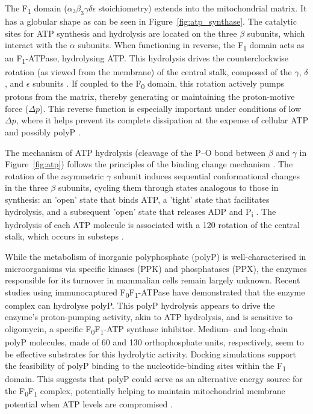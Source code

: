 The F\textsubscript{1} domain ($\alpha_3\beta_3\gamma\delta\epsilon$ stoichiometry) extends into the mitochondrial matrix. It has a globular shape as can be seen in Figure~\ref{fig:atp_synthase}. The catalytic sites for ATP synthesis and hydrolysis are located on the three $\beta$ subunits, which interact with the $\alpha$ subunits. When functioning in reverse, the F\textsubscript{1} domain acts as an F\textsubscript{1}-ATPase, hydrolysing ATP. This hydrolysis drives the counterclockwise rotation (as viewed from the membrane) of the central stalk, composed of the $\gamma$, $\delta$, and $\epsilon$ subunits \citep{walkerATPSynthesisRotary1998, walkerATPSynthaseUnderstood2013, boyerEnergyLifeATP1998}. If coupled to the F\textsubscript{0} domain, this rotation actively pumps protons from the matrix, thereby generating or maintaining the proton-motive force ($\Delta p$). This reverse function is especially important under conditions of low $\Delta p$, where it helps prevent its complete dissipation at the expense of cellular ATP and possibly polyP \citep{bonoraATPSynthesisStorage2012, walkerATPSynthaseUnderstood2013, baevInorganicPolyphosphateProduced2020}.

The mechanism of ATP hydrolysis (cleavage of the P–O bond between $\beta$ and $\gamma$ in Figure~\ref{fig:atp}) follows the principles of the binding change mechanism \citep{walkerATPSynthaseUnderstood2013}. The rotation of the asymmetric $\gamma$ subunit induces sequential conformational changes in the three $\beta$ subunits, cycling them through states analogous to those in synthesis: an 'open' state that binds ATP, a 'tight' state that facilitates hydrolysis, and a subsequent 'open' state that releases ADP and P\textsubscript{i} \citep{walkerATPSynthesisRotary1998, boyerEnergyLifeATP1998}. The hydrolysis of each ATP molecule is associated with a 120\textdegree{} rotation of the central stalk, which occurs in substeps \citep{walkerATPSynthaseUnderstood2013}.

While the metabolism of inorganic polyphosphate (polyP) is well-characterised in microorganisms via specific kinases (PPK) and phosphatases (PPX), the enzymes responsible for its turnover in mammalian cells remain largely unknown. Recent studies using immunocaptured F\textsubscript{0}F\textsubscript{1}-ATPase have demonstrated that the enzyme complex can hydrolyse polyP. This polyP hydrolysis appears to drive the enzyme's proton-pumping activity, akin to ATP hydrolysis, and is sensitive to oligomycin, a specific F\textsubscript{0}F\textsubscript{1}-ATP synthase inhibitor. Medium- and long-chain polyP molecules, made of 60 and 130 orthophosphate units, respectively, seem to be effective substrates for this hydrolytic activity. Docking simulations support the feasibility of polyP binding to the nucleotide-binding sites within the F\textsubscript{1} domain. This suggests that polyP could serve as an alternative energy source for the F\textsubscript{0}F\textsubscript{1} complex, potentially helping to maintain mitochondrial membrane potential when ATP levels are compromised \citep{baevInorganicPolyphosphateProduced2020, baevInorganicPolyphosphateF0F1ATP2022}.

